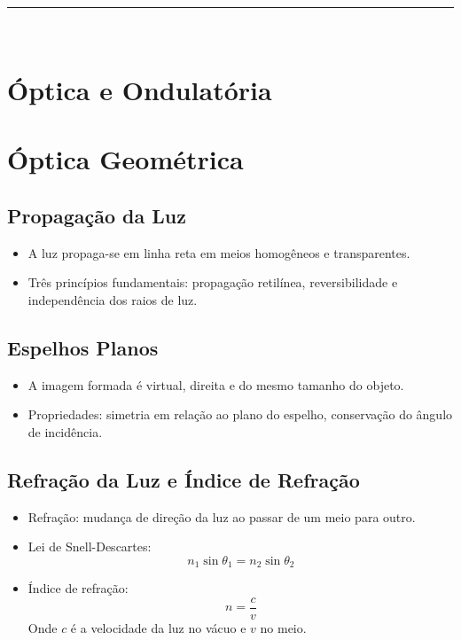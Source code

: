 \documentclass[a4paper,12pt]{article}
\begin{document}
\begin{multicols}{2}
\noindent\rule{\linewidth}{1pt}\\

\section{Óptica e Ondulatória}

\section{Óptica Geométrica}

\subsection{Propagação da Luz}
\begin{itemize}
    \item A luz propaga-se em linha reta em meios homogêneos e transparentes.
    \item Três princípios fundamentais: propagação retilínea, reversibilidade e independência dos raios de luz.
\end{itemize}

\subsection{Espelhos Planos}
\begin{itemize}
    \item A imagem formada é virtual, direita e do mesmo tamanho do objeto.
    \item Propriedades: simetria em relação ao plano do espelho, conservação do ângulo de incidência.
\end{itemize}

\subsection{Refração da Luz e Índice de Refração}
\begin{itemize}
    \item Refração: mudança de direção da luz ao passar de um meio para outro.
    \item Lei de Snell-Descartes:
    \[
        n_1 \sin \theta_1 = n_2 \sin \theta_2
    \]
    \item Índice de refração:
    \[
        n = \frac{c}{v}
    \]
    Onde $c$ é a velocidade da luz no vácuo e $v$ no meio.
\end{itemize}


\end{multicols}
\end{document}
